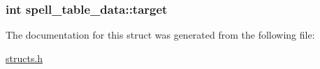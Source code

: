 \hypertarget{structspell__table__data_a326a97e0820ab796ed917054bff836d9}{
\subsubsection[{target}]{\setlength{\rightskip}{0pt plus 5cm}int spell\-\_\-table\-\_\-data\-::target}}\label{structspell__table__data_a326a97e0820ab796ed917054bff836d9}


The documentation for this struct was generated from the following file\-:\begin{DoxyCompactItemize}
\item 
\hyperlink{structs_8h}{structs.\-h}\end{DoxyCompactItemize}

